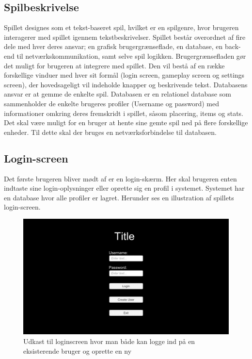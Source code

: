 \newpage

\subsection{Spilbeskrivelse}

Spillet designes som et tekst-baseret spil, hvilket er en spilgenre, hvor brugeren interagerer med spillet igennem tekstbeskrivelser. Spillet består overordnet af fire dele med hver deres ansvar; en grafisk brugergrænseflade, en database, en back-end til netværkskommunikation, samt selve spil logikken. Brugergrænsefladen gør det muligt for brugeren at integrere med spillet. Den vil bestå af en række forskellige vinduer med hver sit formål (login screen, gameplay screen og settings screen), der hovedsageligt vil indeholde knapper og beskrivende tekst. Databasens ansvar er at gemme de enkelte spil. Databasen er en relationel database som sammenholder de enkelte brugeres profiler (Username og password) med informationer omkring deres fremskridt i spillet, såsom placering, items og stats. Det skal være muligt for en bruger at hente sine gemte spil ned på flere forskellige enheder. Til dette skal der bruges en netværksforbindelse til databasen.   

\subsection{Login-screen}
Det første brugeren bliver mødt af er en login-skærm. Her skal brugeren enten indtaste sine login-oplysninger eller oprette sig en profil i systemet. Systemet har en database hvor alle profiler er lagret. Herunder ses en illustration af spillets login-screen. 

\begin{figure}[H]
\centering
\includegraphics[width = \textwidth]{02-Body/Images/Loginscreen-udkast.png}
\caption{Udkast til loginscreen hvor man både kan logge ind på en eksisterende bruger og oprette en ny}
\label{fig:Loginscreen-udkast}
\end{figure}

